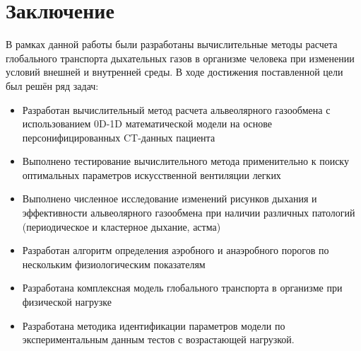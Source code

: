 \chapter*{Заключение}						%

В рамках данной работы были разработаны вычислительные методы расчета глобального транспорта дыхательных газов в организме человека при изменении условий внешней и внутренней среды.
В ходе достижения поставленной цели был решён ряд задач:

\begin{itemize}
\item
Разработан вычислительный метод расчета альвеолярного газообмена с использованием 0D-1D математической модели на основе персонифицированных CT-данных пациента  
\item
Выполнено тестирование вычислительного метода применительно к поиску оптимальных параметров искусственной вентиляции легких
\item
Выполнено численное исследование изменений рисунков дыхания и эффективности альвеолярного газообмена при наличии различных патологий (периодическое и кластерное дыхание, астма)
\item
Разработан алгоритм определения аэробного и анаэробного порогов по нескольким физиологическим показателям
\item
Разработана комплексная модель глобального транспорта в организме при физической нагрузке
\item
Разработана методика идентификации параметров модели по экспериментальным данным тестов с возрастающей нагрузкой.
\end{itemize}


\clearpage